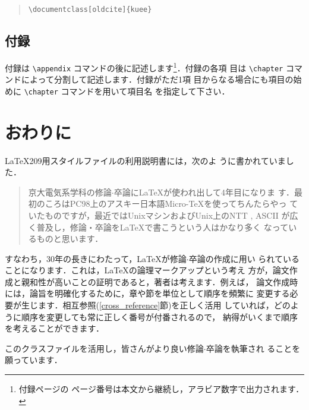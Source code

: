 \documentclass[sotsuron]{kuee}
\begin{document}
\begin{quote}
\begin{verbatim}
\documentclass[oldcite]{kuee}
\end{verbatim}
\end{quote}

\section{付録}

付録は \verb+\appendix+ コマンドの後に記述します\footnote{付録ページの
ページ番号は本文から継続し，アラビア数字で出力されます．}．付録の各項
目は \verb+\chapter+ コマンドによって分割して記述します．付録がただ1項
目からなる場合にも項目の始めに \verb+\chapter+ コマンドを用いて項目名
を指定して下さい．


\chapter{おわりに}
\label{chap:conclusion}

\LaTeX{}209用スタイルファイルの利用説明書\cite{OldTebiki}には，次のよ
うに書かれていました．
\begin{quote}
  京大電気系学科の修論$\cdot$卒論に\LaTeX が使われ出して4年目になりま
  す．最初のころはPC98上のアスキー日本語Micro-\TeX を使ってちんたらやっ
  ていたものですが，最近ではUnixマシンおよびUnix上のNTT \JTeX, ASCII
  \JTeX が広く普及し，修論・卒論を\LaTeX で書こうという人はかなり多く
  なっているものと思います．
\end{quote}
すなわち，30年の長きにわたって，\LaTeX{}が修論$\cdot$卒論の作成に用い
られていることになります．これは，\LaTeX{}の論理マークアップという考え
方が，論文作成と親和性が高いことの証明であると，著者は考えます．例えば，
論文作成時には，論旨を明確化するために，章や節を単位として順序を頻繁に
変更する必要が生じます．相互参照(\ref{cross_reference}節)を正しく活用
していれば，どのように順序を変更しても常に正しく番号が付番されるので，
納得がいくまで順序を考えることができます．

このクラスファイルを活用し，皆さんがより良い修論$\cdot$卒論を執筆され
ることを願っています．
\end{document}
